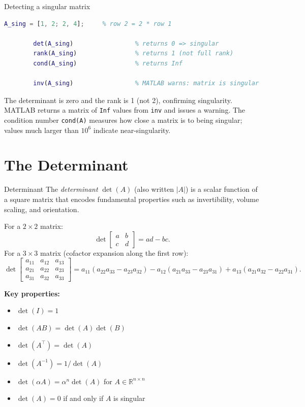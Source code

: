 \begin{examplebox}{Detecting a singular matrix}
	\begin{lstlisting}[language=Matlab]
		A_sing = [1, 2; 2, 4];     % row 2 = 2 * row 1
		
		det(A_sing)                 % returns 0 => singular
		rank(A_sing)                % returns 1 (not full rank)
		cond(A_sing)                % returns Inf
		
		inv(A_sing)                 % MATLAB warns: matrix is singular
	\end{lstlisting}
	\solution
	The determinant is zero and the rank is 1 (not 2), confirming
	singularity.  MATLAB returns a matrix of \texttt{Inf} values from
	\texttt{inv} and issues a warning.  The condition number
	\texttt{cond(A)} measures how close a matrix is to being singular;
	values much larger than $10^6$ indicate near-singularity.
\end{examplebox}

\section{The Determinant}
\label{sec:app_det}

\begin{defnbox}{Determinant}
	The \emph{determinant} $\det(A)$ (also written $|A|$) is a scalar
	function of a square matrix that encodes fundamental properties such as
	invertibility, volume scaling, and orientation.
	
	For a $2\times2$ matrix:
	\[
	\det\!\begin{bmatrix} a & b \\ c & d \end{bmatrix} = ad - bc.
	\]
	For a $3\times3$ matrix (cofactor expansion along the first row):
	\[
	\det\!\begin{bmatrix} a_{11} & a_{12} & a_{13} \\
		a_{21} & a_{22} & a_{23} \\
		a_{31} & a_{32} & a_{33} \end{bmatrix}
	= a_{11}(a_{22}a_{33} - a_{23}a_{32})
	- a_{12}(a_{21}a_{33} - a_{23}a_{31})
	+ a_{13}(a_{21}a_{32} - a_{22}a_{31}).
	\]
\end{defnbox}

\textbf{Key properties:}
\begin{itemize}[noitemsep]
	\item $\det(I) = 1$
	\item $\det(AB) = \det(A)\det(B)$
	\item $\det(A^\top) = \det(A)$
	\item $\det(A^{-1}) = 1/\det(A)$
	\item $\det(\alpha A) = \alpha^n \det(A)$ for $A \in \mathbb{R}^{n\times n}$
	\item $\det(A) = 0$ if and only if $A$ is singular
\end{itemize}

